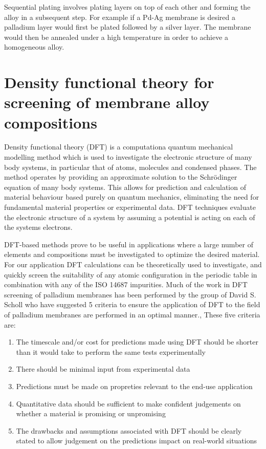 Sequential plating involves plating layers on top of each other and forming the alloy in a subsequent step. For example if a Pd-Ag membrane is desired a palladium layer would first be plated followed by a silver layer. \cite{Exter2015} The membrane would then be annealed under a high temperature in order to achieve a homogeneous alloy. 

\section{Density functional theory for screening of membrane alloy compositions}

Density functional theory (DFT) is a computationa quantum mechanical modelling method which is used to investigate the electronic structure of many body systems, in particular that of atoms, molecules and condensed phases. The method operates by providing an approximate solution to the Schrödinger equation of many body systems. This allows for prediction and calculation of material behaviour based purely on quantum mechanics, eliminating the need for fundamental material properties or experimental data. DFT techniques evaluate the electronic structure of a system by assuming a potential is acting on each of the systems electrons. 

DFT-based methods prove to be useful in applications where a large number of elements and compositions must be investigated to optimize the desired material. For our application DFT calculations can be theoretically used to investigate, and quickly screen the suitability of any atomic configuration in the periodic table in combination with any of the ISO 14687 impurities. Much of the work in DFT screening of palladium membranes has been performed by the group of David S. Scholl who have suggested 5 criteria to ensure the application of DFT to the field of palladium membranes are performed in an optimal manner.\cite{SHOLL2007462}, \cite{doi:10.1021/ar500018b} These five criteria are:

\begin{enumerate}
    \item The timescale and/or cost for predictions made using DFT should be shorter than it would take to perform the same tests experimentally
    \item There should be minimal input from experimental data
    \item Predictions must be made on propreties relevant to the end-use application
    \item Quantitative data should be sufficient to make confident judgements on whether a material is promising or unpromising
    \item The drawbacks and assumptions associated with DFT should be clearly stated to allow judgement on the predictions impact on real-world situations
\end{enumerate}

